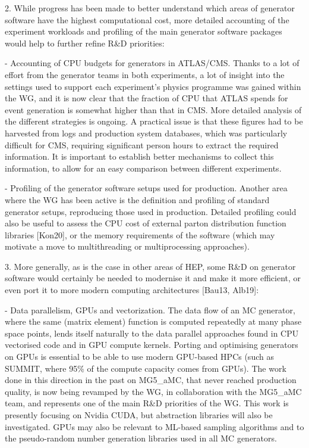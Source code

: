 \documentclass[11pt,a4paper]{article}
\begin{document}
2. While progress has been made to better understand which areas of
generator software have the highest computational cost, more detailed
accounting of the experiment workloads and profiling of the main
generator software packages would help to further refine R\&D
priorities:

- {Accounting of CPU budgets for generators in ATLAS/CMS}. Thanks to a
lot of effort from the generator teams in both experiments, a lot of
insight into the settings used to support each experiment's physics
programme was gained within the WG, and it is now clear that the
fraction of CPU that ATLAS spends for event generation is somewhat
higher than that in CMS. More detailed analysis of the different
strategies is ongoing. A practical issue is that these figures had to be
harvested from logs and production system databases, which was
particularly difficult for CMS, requiring significant person hours to
extract the required information. It is important to establish better
mechanisms to collect this information, to allow for an easy comparison
between different experiments.

- {Profiling of the generator software setups used for production}.
Another area where the WG has been active is the definition and
profiling of standard generator setups, reproducing those used in
production. Detailed profiling could also be useful to assess the CPU
cost of external parton distribution function libraries {[}Kon20{]}, or
the memory requirements of the software (which may motivate a move to
multithreading or multiprocessing approaches).

3. More generally, as is the case in other areas of HEP, some R\&D on
generator software would certainly be needed to modernise it and make it
more efficient, or even port it to more modern computing architectures
{[}Bau13, Alb19{]}:

- {Data parallelism, GPUs and vectorization}. The data flow of an MC
generator, where the same (matrix element) function is computed
repeatedly at many phase space points, lends itself naturally to the
data parallel approaches found in CPU vectorised code and in GPU compute
kernels. Porting and optimising generators on GPUs is essential to be
able to use modern GPU-based HPCs (such as SUMMIT, where 95\% of the
compute capacity comes from GPUs). The work done in this direction in
the past on MG5\_aMC, that never reached production quality, is now
being revamped by the WG, in collaboration with the MG5\_aMC team, and
represents one of the main R\&D priorities of the WG. This work is
presently focusing on Nvidia CUDA, but abstraction libraries will also
be investigated. GPUs may also be relevant to ML-based sampling
algorithms and to the pseudo-random number generation libraries used in
all MC generators.
\end{document}
